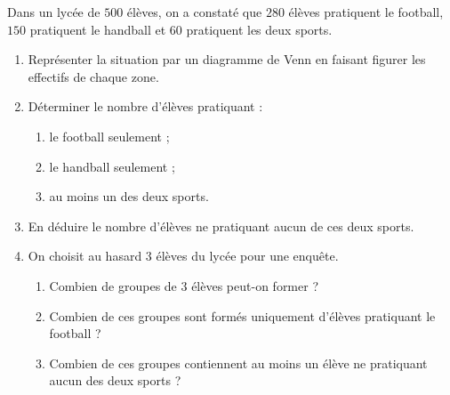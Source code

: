 \documentclass[11pt]{article}
\begin{document}
\begin{exercice}
Dans un lycée de $500$ élèves, on a constaté que $280$ élèves pratiquent le football, $150$ pratiquent le handball et $60$ pratiquent les deux sports.
\begin{enumerate}
\item Représenter la situation par un diagramme de Venn en faisant figurer les effectifs de chaque zone.
\item Déterminer le nombre d'élèves pratiquant :
\begin{enumerate}
\item le football seulement ;
\item le handball seulement ;
\item au moins un des deux sports.
\end{enumerate}
\item En déduire le nombre d'élèves ne pratiquant aucun de ces deux sports.
\item On choisit au hasard $3$ élèves du lycée pour une enquête.
\begin{enumerate}
\item Combien de groupes de $3$ élèves peut-on former ?
\item Combien de ces groupes sont formés uniquement d'élèves pratiquant le football ?
\item Combien de ces groupes contiennent au moins un élève ne pratiquant aucun des deux sports ?
\end{enumerate}
\end{enumerate}
\end{exercice}
\end{document}
